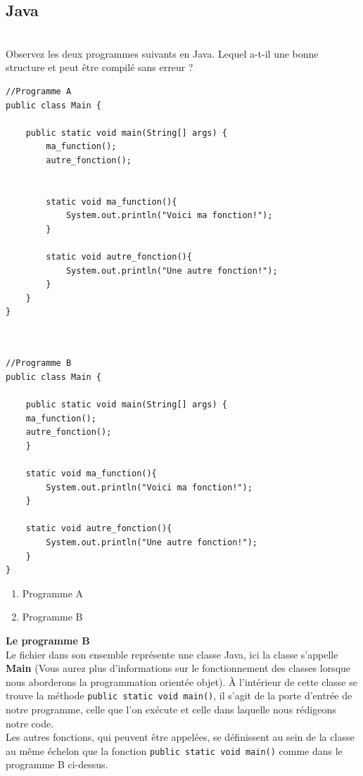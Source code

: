 \subsection{Java}


\begin{Exercice}[3 minutes] \\
Observez les deux programmes suivants en Java. Lequel a-t-il une bonne structure et peut être compilé sans erreur ?

\begin{multicols}{2}
\begin{lstlisting}
//Programme A
public class Main {

    public static void main(String[] args) {
        ma_function();
        autre_fonction();
    

        static void ma_function(){
            System.out.println("Voici ma fonction!");
        }
    
        static void autre_fonction(){
            System.out.println("Une autre fonction!");
        }
    }
}



\end{lstlisting}
\columnbreak

\begin{lstlisting}
//Programme B
public class Main {

    public static void main(String[] args) {
    ma_function();
    autre_fonction();
    }

    static void ma_function(){
        System.out.println("Voici ma fonction!");
    }

    static void autre_fonction(){
        System.out.println("Une autre fonction!");
    }
}
\end{lstlisting}
\columnbreak

\end{multicols}
\begin{enumerate}
    \item Programme A
    \item Programme B
\end{enumerate}
\begin{solution}
    \textbf{Le programme B}\\
    Le fichier dans son ensemble représente une classe Java, ici la classe s'appelle \textbf{Main} (Vous aurez plus d'informations sur le fonctionnement des classes lorsque nous aborderons la programmation orientée objet). À l'intérieur de cette classe se trouve la méthode \lstinline{public static void main()}, il s'agit de la porte d'entrée de notre programme, celle que l'on exécute et celle dans laquelle nous rédigeons notre code.\\
    Les autres fonctions, qui peuvent être appelées, se définissent au sein de la classe au même échelon que la fonction \lstinline{public static void main()} comme dans le programme B ci-dessus. 
\end{solution}
\end{Exercice}

